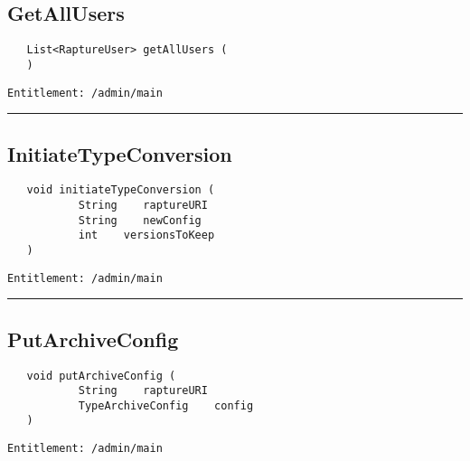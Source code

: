 \subsection{GetAllUsers}
\label{Api:GetAllUsers}
\begin{verbatim}
   List<RaptureUser> getAllUsers (
   )
\end{verbatim}
\begin{Verbatim}[fontsize=\small, formatcom=\color{Maroon}]
  Entitlement: /admin/main
\end{Verbatim}



\rule{12cm}{2pt}
\subsection{InitiateTypeConversion}
\label{Api:InitiateTypeConversion}
\begin{verbatim}
   void initiateTypeConversion (
           String    raptureURI
           String    newConfig
           int    versionsToKeep
   )
\end{verbatim}
\begin{Verbatim}[fontsize=\small, formatcom=\color{Maroon}]
  Entitlement: /admin/main
\end{Verbatim}



\rule{12cm}{2pt}
\subsection{PutArchiveConfig}
\label{Api:PutArchiveConfig}
\begin{verbatim}
   void putArchiveConfig (
           String    raptureURI
           TypeArchiveConfig    config
   )
\end{verbatim}
\begin{Verbatim}[fontsize=\small, formatcom=\color{Maroon}]
  Entitlement: /admin/main
\end{Verbatim}



